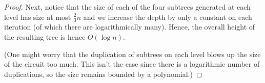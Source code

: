 \documentclass[11pt,letterpaper]{article}
\begin{document}
\begin{proof}
    Next, notice that the size of each of the four subtrees generated at each
    level has size at most $\frac{2}{3}n$ and we increase the depth by only a
    constant on each iteration (of which there are logarithmically many).
    Hence, the overall height of the resulting tree is hence $O(\log n)$.

    (One might worry that the duplication of subtrees on each level blows up
    the size of the circuit too much. This isn't the case since there is a
    logarithmic number of duplications, so the size remains bounded by a
    polynomial.)
\end{proof}
\end{document}
